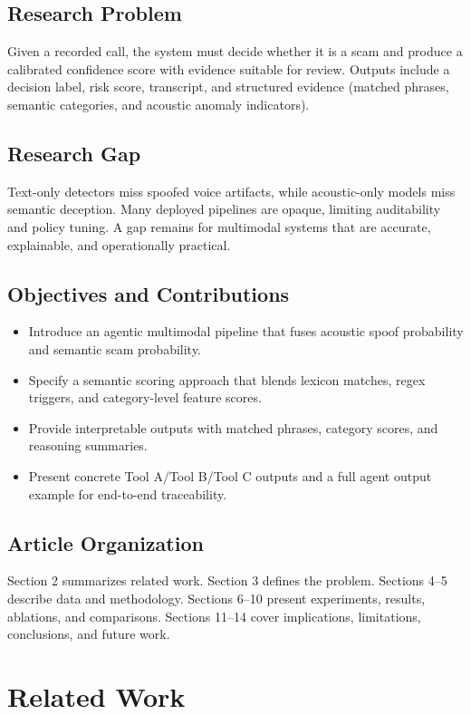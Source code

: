 \documentclass[11pt,a4paper]{article}
\begin{document}
\subsection{Research Problem}
Given a recorded call, the system must decide whether it is a scam and produce a calibrated confidence score with evidence suitable for review. Outputs include a decision label, risk score, transcript, and structured evidence (matched phrases, semantic categories, and acoustic anomaly indicators).

\subsection{Research Gap}
Text-only detectors miss spoofed voice artifacts, while acoustic-only models miss semantic deception. Many deployed pipelines are opaque, limiting auditability and policy tuning. A gap remains for multimodal systems that are accurate, explainable, and operationally practical.

\subsection{Objectives and Contributions}
\begin{itemize}[noitemsep]
\item Introduce an agentic multimodal pipeline that fuses acoustic spoof probability and semantic scam probability.
\item Specify a semantic scoring approach that blends lexicon matches, regex triggers, and category-level feature scores.
\item Provide interpretable outputs with matched phrases, category scores, and reasoning summaries.
\item Present concrete Tool A/Tool B/Tool C outputs and a full agent output example for end-to-end traceability.
\end{itemize}

\subsection{Article Organization}
Section 2 summarizes related work. Section 3 defines the problem. Sections 4--5 describe data and methodology. Sections 6--10 present experiments, results, ablations, and comparisons. Sections 11--14 cover implications, limitations, conclusions, and future work.

\section{Related Work}
\end{document}
